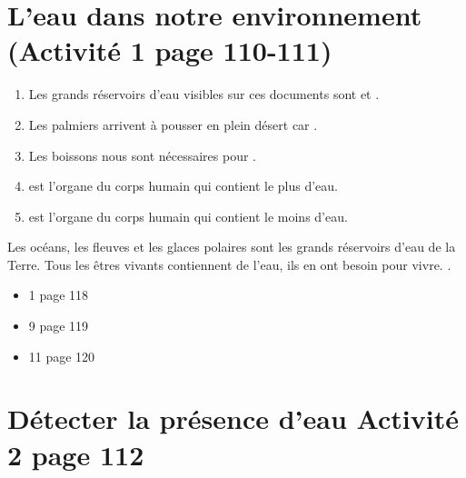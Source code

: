 \documentclass[12pt,a4paper]{article}
\date{}
\title{}
\begin{document}
	
	

\section{L'eau dans notre environnement \footnotesize{(Activité 1 page 110-111)}}

\begin{myact}{}
	\begin{enumerate}
		\item Les grands réservoirs d'eau visibles sur ces documents sont  et .
		\item Les palmiers arrivent à pousser en plein désert car .
		\item Les boissons nous sont nécessaires pour .
		\item {} est l'organe du corps humain qui contient le plus d'eau.
		\item {} est l'organe du corps humain qui contient le moins d'eau.
	\end{enumerate}
\end{myact}

\begin{mybilan}
	Les océans, les fleuves et les glaces polaires sont les grands réservoirs d'eau de la Terre. Tous les êtres vivants contiennent de l'eau, ils en ont besoin pour vivre. .
\end{mybilan}

\begin{myexos}
	\begin{itemize}
		\item 1 page 118
		\item 9 page 119
		\item 11 page 120
	\end{itemize}
\end{myexos}

\section{Détecter la présence d'eau \footnotesize{Activité 2 page 112}}
\end{document}
